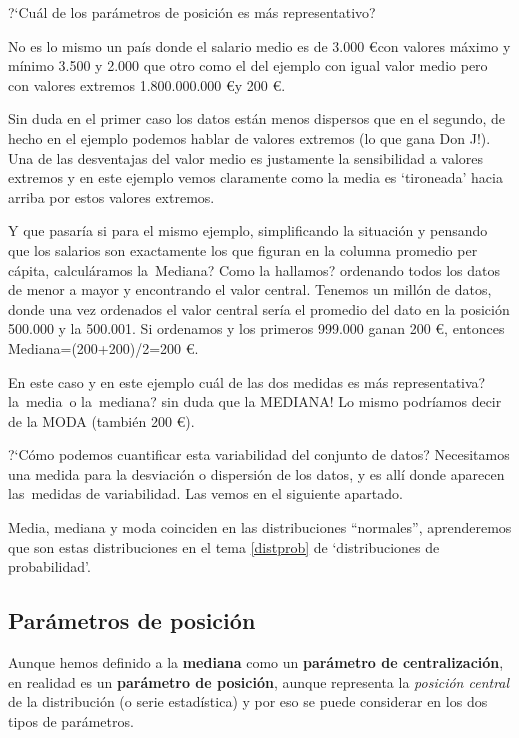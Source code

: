 \begin{myexampleblock}{?`Cuál de los parámetros de posición es más representativo?}
\begin{small}
\vspace{2mm} No es lo mismo un país donde el salario medio es de 3.000 \euro con valores máximo y mínimo 3.500 y 2.000 que otro como el del ejemplo con igual valor medio pero con valores extremos 1.800.000.000 \euro y 200 \euro.

\vspace{2mm} Sin duda en el primer caso los datos están menos dispersos que en el segundo, de hecho en el ejemplo podemos hablar de valores extremos (lo que gana Don J!). Una de las desventajas del valor medio es justamente la sensibilidad a valores extremos y en este ejemplo vemos claramente como la media es `tironeada' hacia arriba por estos valores extremos.

\vspace{2mm} Y que pasaría si para el mismo ejemplo, simplificando la situación y pensando que los salarios son exactamente los que figuran en la columna promedio per cápita, calculáramos la Mediana? Como la hallamos? ordenando todos los datos de menor a mayor y encontrando el valor central. Tenemos un millón de datos, donde una vez ordenados el valor central sería el promedio del dato en la posición 500.000 y la 500.001. Si ordenamos y los primeros 999.000 ganan 200 \euro, entonces 
Mediana=(200+200)/2=200 \euro.

\vspace{2mm} En este caso y en este ejemplo cuál de las dos medidas es más representativa? la media o la mediana? sin duda que la MEDIANA! Lo mismo podríamos decir de la MODA (también 200 \euro).

\vspace{2mm} ?`Cómo podemos cuantificar esta variabilidad del conjunto de datos? Necesitamos una medida para la desviación o dispersión de los datos, y es allí donde aparecen las medidas de variabilidad. Las vemos en el siguiente apartado.  
\end{small}

\end{myexampleblock}

Media, mediana y moda coinciden en las distribuciones ``normales'', aprenderemos que son estas distribuciones en el tema \ref{distprob} de `distribuciones de probabilidad'.

\subsection{Parámetros de posición}
	
	Aunque hemos definido a la \textbf{mediana} como un \textbf{parámetro de centralización}, en realidad es un \textbf{parámetro de posición}, aunque representa la \emph{posición central} de la distribución (o serie estadística) y por eso se puede considerar en los dos tipos de parámetros.
	
